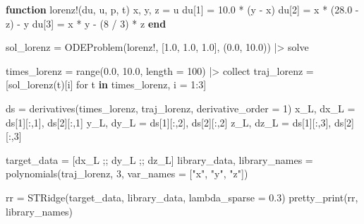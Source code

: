 \documentclass[
]{article}
\newenvironment{Shaded}{\begin{snugshade}}{\end{snugshade}}
\newcommand{\FloatTok}[1]{\textcolor[rgb]{0.68,0.00,0.00}{#1}}
\newcommand{\FunctionTok}[1]{\textcolor[rgb]{0.28,0.35,0.67}{#1}}
\newcommand{\KeywordTok}[1]{\textcolor[rgb]{0.00,0.23,0.31}{\textbf{#1}}}
\newcommand{\NormalTok}[1]{\textcolor[rgb]{0.00,0.23,0.31}{#1}}
\newcommand{\OperatorTok}[1]{\textcolor[rgb]{0.37,0.37,0.37}{#1}}
\newcommand{\StringTok}[1]{\textcolor[rgb]{0.13,0.47,0.30}{#1}}
\begin{document}
\begin{Shaded}
\begin{Highlighting}[]
\KeywordTok{function} \FunctionTok{lorenz!}\NormalTok{(du, u, p, t)}
\NormalTok{    x, y, z }\OperatorTok{=}\NormalTok{ u}
\NormalTok{    du[}\FloatTok{1}\NormalTok{] }\OperatorTok{=} \FloatTok{10.0} \OperatorTok{*}\NormalTok{ (y }\OperatorTok{{-}}\NormalTok{ x)}
\NormalTok{    du[}\FloatTok{2}\NormalTok{] }\OperatorTok{=}\NormalTok{ x }\OperatorTok{*}\NormalTok{ (}\FloatTok{28.0} \OperatorTok{{-}}\NormalTok{ z) }\OperatorTok{{-}}\NormalTok{ y}
\NormalTok{    du[}\FloatTok{3}\NormalTok{] }\OperatorTok{=}\NormalTok{ x }\OperatorTok{*}\NormalTok{ y }\OperatorTok{{-}}\NormalTok{ (}\FloatTok{8} \OperatorTok{/} \FloatTok{3}\NormalTok{) }\OperatorTok{*}\NormalTok{ z}
\KeywordTok{end}

\NormalTok{sol\_lorenz }\OperatorTok{=} \FunctionTok{ODEProblem}\NormalTok{(lorenz!, [}\FloatTok{1.0}\NormalTok{, }\FloatTok{1.0}\NormalTok{, }\FloatTok{1.0}\NormalTok{], (}\FloatTok{0.0}\NormalTok{, }\FloatTok{10.0}\NormalTok{)) }\OperatorTok{|\textgreater{}}\NormalTok{ solve}

\NormalTok{times\_lorenz }\OperatorTok{=} \FunctionTok{range}\NormalTok{(}\FloatTok{0.0}\NormalTok{, }\FloatTok{10.0}\NormalTok{, length }\OperatorTok{=} \FloatTok{100}\NormalTok{) }\OperatorTok{|\textgreater{}}\NormalTok{ collect}
\NormalTok{traj\_lorenz }\OperatorTok{=}\NormalTok{ [}\FunctionTok{sol\_lorenz}\NormalTok{(t)[i] for t }\KeywordTok{in}\NormalTok{ times\_lorenz, i }\OperatorTok{=} \FloatTok{1}\OperatorTok{:}\FloatTok{3}\NormalTok{]}

\NormalTok{ds }\OperatorTok{=} \FunctionTok{derivatives}\NormalTok{(times\_lorenz, traj\_lorenz, derivative\_order }\OperatorTok{=} \FloatTok{1}\NormalTok{)}
\NormalTok{x\_L, dx\_L }\OperatorTok{=}\NormalTok{ ds[}\FloatTok{1}\NormalTok{][}\OperatorTok{:}\NormalTok{,}\FloatTok{1}\NormalTok{], ds[}\FloatTok{2}\NormalTok{][}\OperatorTok{:}\NormalTok{,}\FloatTok{1}\NormalTok{]}
\NormalTok{y\_L, dy\_L }\OperatorTok{=}\NormalTok{ ds[}\FloatTok{1}\NormalTok{][}\OperatorTok{:}\NormalTok{,}\FloatTok{2}\NormalTok{], ds[}\FloatTok{2}\NormalTok{][}\OperatorTok{:}\NormalTok{,}\FloatTok{2}\NormalTok{]}
\NormalTok{z\_L, dz\_L }\OperatorTok{=}\NormalTok{ ds[}\FloatTok{1}\NormalTok{][}\OperatorTok{:}\NormalTok{,}\FloatTok{3}\NormalTok{], ds[}\FloatTok{2}\NormalTok{][}\OperatorTok{:}\NormalTok{,}\FloatTok{3}\NormalTok{]}

\NormalTok{target\_data }\OperatorTok{=}\NormalTok{ [dx\_L ;; dy\_L ;; dz\_L]}
\NormalTok{library\_data, library\_names }\OperatorTok{=} \FunctionTok{polynomials}\NormalTok{(traj\_lorenz, }\FloatTok{3}\NormalTok{, var\_names }\OperatorTok{=}\NormalTok{ [}\StringTok{"x"}\NormalTok{, }\StringTok{"y"}\NormalTok{, }\StringTok{"z"}\NormalTok{])}

\NormalTok{rr }\OperatorTok{=} \FunctionTok{STRidge}\NormalTok{(target\_data, library\_data, lambda\_sparse }\OperatorTok{=} \FloatTok{0.3}\NormalTok{)}
\FunctionTok{pretty\_print}\NormalTok{(rr, library\_names)}
\end{Highlighting}
\end{Shaded}
\end{document}
